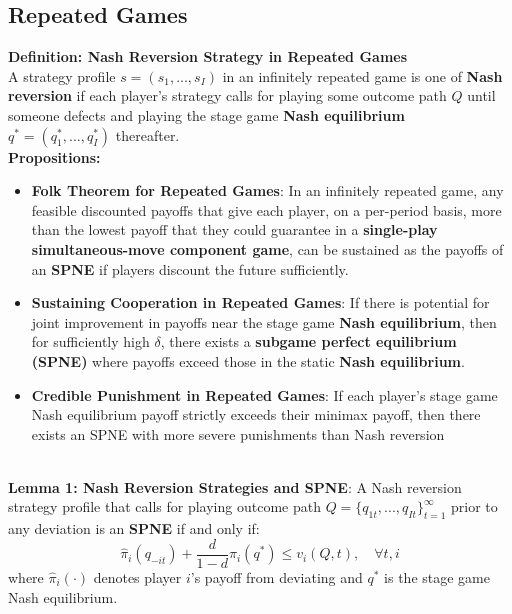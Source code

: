 \documentclass{article}
\begin{document}
\subsection{Repeated Games}

\textbf{Definition: Nash Reversion Strategy in Repeated Games} \\
A strategy profile $s = (s_1, ..., s_I)$ in an infinitely repeated game is one of \textbf{Nash reversion} if each player’s strategy calls for playing some outcome path $Q$ until someone defects and playing the stage game \textbf{Nash equilibrium} $q^* = (q^*_1, ..., q^*_I)$ thereafter.
\\

\textbf{Propositions:}
\begin{itemize}
    \item \textbf{Folk Theorem for Repeated Games}: In an infinitely repeated game, any feasible discounted payoffs that give each player, on a per-period basis, more than the lowest payoff that they could guarantee in a \textbf{single-play simultaneous-move component game}, can be sustained as the payoffs of an \textbf{SPNE} if players discount the future sufficiently.

    \item \textbf{Sustaining Cooperation in Repeated Games}: If there is potential for joint improvement in payoffs near the stage game \textbf{Nash equilibrium}, then for sufficiently high $\delta$, there exists a \textbf{subgame perfect equilibrium (SPNE)} where payoffs exceed those in the static \textbf{Nash equilibrium}. 
    
    \item \textbf{Credible Punishment in Repeated Games}: If each player’s stage game Nash equilibrium payoff strictly exceeds their minimax payoff, then there exists an SPNE with more severe punishments than Nash reversion 
\end{itemize}
\\

\textbf{Lemma 1: Nash Reversion Strategies and SPNE}: A Nash reversion strategy profile that calls for playing outcome path $Q = \{q_{1t} , ..., q_{It}\}_{t=1}^{\infty}$ prior to any deviation is an \textbf{SPNE} if and only if:
\[
\hat{\pi}_i(q_{-it}) + \frac{d}{1 - d} \pi_i(q^*) \leq v_i(Q, t), \quad \forall t, i
\]
where $\hat{\pi}_i(\cdot)$ denotes player $i$’s payoff from deviating and $q^*$ is the stage game Nash equilibrium.



\end{document}
